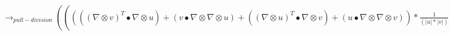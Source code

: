 \documentclass{article}
\begin{document}
\\\newline $\rightarrow_{pull-division}((((( \nabla  \otimes v)^T \bullet  \nabla  \otimes u)+(v \bullet  \nabla  \otimes  \nabla  \otimes u)+(( \nabla  \otimes u)^T \bullet  \nabla  \otimes v)+(u \bullet  \nabla  \otimes  \nabla  \otimes v))*\frac{1}{(|u|*|v|)}+(((u \bullet v)*((v \bullet  \nabla  \otimes v) \otimes (v \bullet  \nabla  \otimes v)))+(2*(u \bullet v)*((v \bullet  \nabla  \otimes v) \otimes (v \bullet  \nabla  \otimes v))))*\frac{1}{(|u|*|v|*((v \bullet v))^2)}+((u \bullet v)*((v \bullet  \nabla  \otimes v) \otimes (u \bullet  \nabla  \otimes u)))*\frac{1}{((u \bullet u)*|v|*|u|*(v \bullet v))}+((u \bullet v)*((u \bullet  \nabla  \otimes u) \otimes (v \bullet  \nabla  \otimes v)))*\frac{1}{(|u|*|v|*(u \bullet u)*(v \bullet v))}+((u \bullet v)*((u \bullet  \nabla  \otimes u) \otimes (u \bullet  \nabla  \otimes u)))*\frac{1}{(|u|*|v|*((u \bullet u))^2)}+(2*|u|*(u \bullet v)*((u \bullet  \nabla  \otimes u) \otimes (u \bullet  \nabla  \otimes u)))*\frac{1}{(|v|*(u \bullet u)*((u \bullet u))^2)})-(((((v \bullet  \nabla  \otimes u) \otimes (v \bullet  \nabla  \otimes v)))+(((u \bullet  \nabla  \otimes v) \otimes (v \bullet  \nabla  \otimes v))))*\frac{1}{(|u|*|v|*(v \bullet v))}+(((u \bullet  \nabla  \otimes v) \otimes (u \bullet  \nabla  \otimes u)))*\frac{1}{(|v|*|u|*(u \bullet u))}+((((v \bullet  \nabla  \otimes v) \otimes (u \bullet  \nabla  \otimes v)))+((u \bullet v)*(v \bullet  \nabla  \otimes  \nabla  \otimes v))+((u \bullet v)*(( \nabla  \otimes v)^T \bullet  \nabla  \otimes v))+(((v \bullet  \nabla  \otimes v) \otimes (v \bullet  \nabla  \otimes u))))*\frac{1}{(|v|*|u|*(v \bullet v))}+((((v \bullet  \nabla  \otimes u) \otimes (u \bullet  \nabla  \otimes u)))+(((u \bullet  \nabla  \otimes u) \otimes (v \bullet  \nabla  \otimes u)))+(((u \bullet  \nabla  \otimes u) \otimes (u \bullet  \nabla  \otimes v))))*\frac{1}{(|u|*|v|*(u \bullet u))}+((|u|*(u \bullet v)*(u \bullet  \nabla  \otimes  \nabla  \otimes u))+(|u|*(u \bullet v)*(( \nabla  \otimes u)^T \bullet  \nabla  \otimes u)))*\frac{1}{(|v|*(u \bullet u)*(u \bullet u))}))$
 
\end{document}
